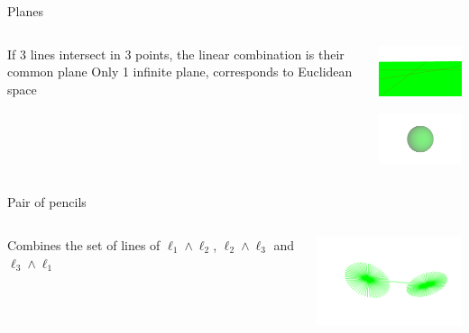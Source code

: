 \documentclass{beamer}
\begin{document}
\begin{frame}{Planes}
  \begin{columns}
    \begin{column}{5cm}
      If 3 lines intersect in 3 points, the linear combination is their common plane
      \bigskip
      Only 1 infinite plane, corresponds to Euclidean space
    \end{column}
    \begin{column}{5cm}
      \begin{center}
        \includegraphics[width=5cm]{plane1}

        \includegraphics[width=5cm]{plane2}
      \end{center}
    \end{column}
  \end{columns}
\end{frame}

\begin{frame}{Pair of pencils}
  \begin{columns}
    \begin{column}{5cm}
      Combines the set of lines of $\ell_1 \wedge \ell_2$, $\ell_2 \wedge \ell_3$ and $\ell_3 \wedge \ell_1$
    \end{column}
    \begin{column}{5cm}
      \begin{center}
        \includegraphics[width=5cm]{cwpencil}
      \end{center}
    \end{column}
  \end{columns}
\end{frame}
\end{document}
